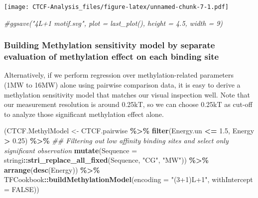 \documentclass[
]{article}
\newenvironment{Shaded}{\begin{snugshade}}{\end{snugshade}}
\newcommand{\CommentTok}[1]{\textcolor[rgb]{0.56,0.35,0.01}{\textit{#1}}}
\newcommand{\DataTypeTok}[1]{\textcolor[rgb]{0.13,0.29,0.53}{#1}}
\newcommand{\FloatTok}[1]{\textcolor[rgb]{0.00,0.00,0.81}{#1}}
\newcommand{\KeywordTok}[1]{\textcolor[rgb]{0.13,0.29,0.53}{\textbf{#1}}}
\newcommand{\NormalTok}[1]{#1}
\newcommand{\OperatorTok}[1]{\textcolor[rgb]{0.81,0.36,0.00}{\textbf{#1}}}
\newcommand{\OtherTok}[1]{\textcolor[rgb]{0.56,0.35,0.01}{#1}}
\newcommand{\StringTok}[1]{\textcolor[rgb]{0.31,0.60,0.02}{#1}}
\begin{document}
\texttt{[image: CTCF-Analysis\_files/figure-latex/unnamed-chunk-7-1.pdf]}

\begin{Shaded}
\begin{Highlighting}[]
\CommentTok{\#ggsave("4L+1 motif.svg", plot = last\_plot(), height = 4.5, width = 9)}
\end{Highlighting}
\end{Shaded}

\hypertarget{building-methylation-sensitivity-model-by-separate-evaluation-of-methylation-effect-on-each-binding-site}{%
\subsubsection{Building Methylation sensitivity model by separate
evaluation of methylation effect on each binding
site}\label{building-methylation-sensitivity-model-by-separate-evaluation-of-methylation-effect-on-each-binding-site}}

Alternatively, if we perform regression over methylation-related
parameters (1MW to 16MW) alone using pairwise comparison data, it is
easy to derive a methylation sensitivity model that matches our visual
inspection well. Note that our measurement resolution is around 0.25kT,
so we can choose 0.25kT as cut-off to analyze those significant
methylation effect alone.

\begin{Shaded}
\begin{Highlighting}[]
\NormalTok{(CTCF.MethylModel \textless{}{-}}\StringTok{ }\NormalTok{CTCF.pairwise }\OperatorTok{\%\textgreater{}\%}
\StringTok{  }\KeywordTok{filter}\NormalTok{(Energy.un }\OperatorTok{\textless{}=}\StringTok{ }\FloatTok{1.5}\NormalTok{, Energy }\OperatorTok{\textgreater{}}\StringTok{ }\FloatTok{0.25}\NormalTok{) }\OperatorTok{\%\textgreater{}\%}\StringTok{ }\CommentTok{\#\# Filtering out low affinity binding sites and select only significant observation}
\StringTok{  }\KeywordTok{mutate}\NormalTok{(}\DataTypeTok{Sequence =}\NormalTok{ stringi}\OperatorTok{::}\KeywordTok{stri\_replace\_all\_fixed}\NormalTok{(Sequence, }\StringTok{"CG"}\NormalTok{, }\StringTok{"MW"}\NormalTok{)) }\OperatorTok{\%\textgreater{}\%}
\StringTok{  }\KeywordTok{arrange}\NormalTok{(}\KeywordTok{desc}\NormalTok{(Energy)) }\OperatorTok{\%\textgreater{}\%}
\StringTok{  }\NormalTok{TFCookbook}\OperatorTok{::}\KeywordTok{buildMethylationModel}\NormalTok{(}\DataTypeTok{encoding =} \StringTok{"(3+1)L+1"}\NormalTok{, }\DataTypeTok{withIntercept =} \OtherTok{FALSE}\NormalTok{))}
\end{Highlighting}
\end{Shaded}
\end{document}
